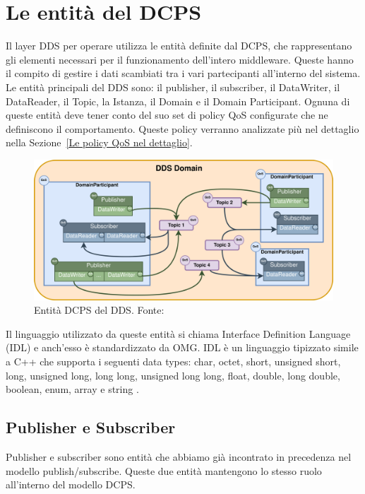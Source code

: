 

\section{Le entità del DCPS}
Il layer DDS per operare utilizza le entità definite dal DCPS, 
che rappresentano gli elementi necessari
per il funzionamento dell'intero middleware. Queste hanno il compito di 
gestire i dati
scambiati tra i vari partecipanti all'interno del sistema. 
Le entità principali del DDS sono: 
il publisher, il subscriber, il DataWriter, il DataReader, il Topic,
la Istanza, il Domain e il Domain Participant.
Ognuna di queste entità deve tener conto del suo set di policy 
QoS configurate
che ne definiscono il comportamento. Queste policy verranno analizzate 
più nel dettaglio nella Sezione~\ref{Le policy QoS nel dettaglio}.

\begin{figure}[H]
    \centering
    \includegraphics[width=15.2cm, keepaspectratio]{img/entitadcps .png}
    \caption{Entità DCPS del DDS. 
    Fonte: \cite{whatddseprosima}}
    \label{entitadcps}
\end{figure}



Il linguaggio utilizzato da queste entità si chiama Interface 
Definition Language (IDL) e anch'esso è standardizzato da OMG. 
IDL è un linguaggio tipizzato 
simile a C++ che supporta i seguenti data types: char, octet, short,
unsigned short, long, unsigned long, long long, unsigned long long, 
float, double, long double, boolean, enum, array e string
\cite{1494965}.


\subsection{Publisher e Subscriber}
Publisher e subscriber sono entità che abbiamo già incontrato
in precedenza nel modello publish/subscribe. Queste due entità 
mantengono lo stesso ruolo all'interno del modello DCPS.

